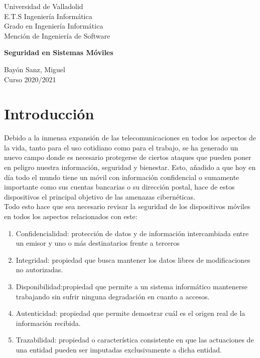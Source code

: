 \documentclass[11pt]{article}
\begin{document}
\begin{titlepage}
\begin{flushright}
\hfill\parbox[r][][c]{0.5\textwidth}{
{\fontsize{14}{14}\selectfont Universidad de Valladolid \\
E.T.S Ingeniería Informática \\
Grado en Ingeniería Informática \\ 
Mención de Ingeniería de Software}}

\end{flushright}

\vfill
\centering
{\fontsize{20pt}{1cm}\selectfont \textbf{Seguridad en Sistemas Móviles}
}


\vfill
\begin{flushright}
\hfill\parbox[r][][c]{0.4\textwidth}{
{\fontsize{14pt}{14cm}\selectfont
Bayón Sanz, Miguel \\
Curso 2020/2021
}}
\end{flushright}

\end{titlepage}

\tableofcontents
\newpage

\section{Introducción}

{Debido a la inmensa expansión de las telecomunicaciones en todos los aspectos de la vida, tanto para el uso cotidiano como para el trabajo, se ha generado un nuevo campo donde es necesario protegerse de ciertos ataques que pueden poner en peligro nuestra información, seguridad y bienestar. Esto, añadido a que hoy en día todo el mundo tiene un móvil con información confidencial o sumamente importante como sus cuentas bancarias o su dirección postal, hace de estos dispositivos el principal objetivo de las amenazas cibernéticas.} \\

{Todo esto hace que sea necesario revisar la seguridad de los dispositivos móviles en todos los aspectos relacionados con este:}

\begin{enumerate}
    \item Confidencialidad: protección de datos y de información intercambiada entre un emisor y uno o más destinatarios frente a terceros
    \item Integridad: propiedad que busca mantener los datos libres de modificaciones no autorizadas.
    \item Disponibilidad:propiedad que permite a un sistema informático mantenerse trabajando sin sufrir ninguna degradación en cuanto a accesos.
    \item Autenticidad: propiedad que permite demostrar cuál es el origen real de la información recibida.
    \item Trazabilidad: propiedad o característica consistente en que las actuaciones de una entidad pueden ser imputadas exclusivamente a dicha entidad.
\end{enumerate}
\end{document}
